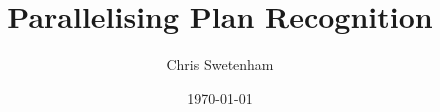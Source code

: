 \documentclass[12pt,twoside,abbrevs,msc,ai,notimes,logo,sansheadings]{infthesis}
\title{Parallelising Plan Recognition}
\author{Chris Swetenham}
\date{\today}
\begin{document}
  \begin{preliminary}
    \maketitle

    
    \standarddeclaration
    \tableofcontents
    \listoffigures
  \end{preliminary}

  
  
  
  
  
  
  

  \appendix

  

  {}
  
\end{document}
